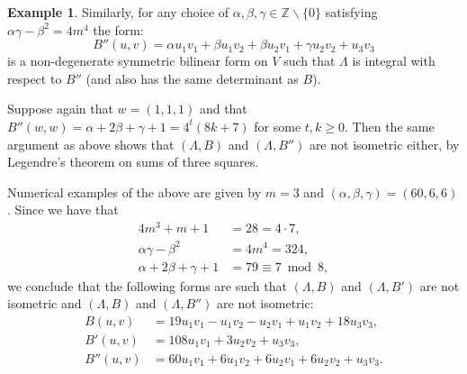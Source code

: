 \documentclass{amsart}
\theoremstyle{plain}
\theoremstyle{definition}
\newtheorem{eg}[theorem]{Example}
\begin{document}
\begin{eg}
Similarly, for any choice of $\alpha,\beta,\gamma\in\mathbb{Z}\backslash\{0\}$ satisfying $\alpha\gamma - \beta^2 = 4m^4$ the form: \[B''(u,v) = \alpha u_1v_1 + \beta u_1v_2 + \beta u_2v_1 + \gamma u_2v_2 + u_3v_3\] is a non-degenerate symmetric bilinear form on $V$ such that $\Lambda$ is integral with respect to $B''$ (and also has the same determinant as $B$).

Suppose again that $w=(1,1,1)$ and that $B''(w,w) = \alpha + 2\beta + \gamma + 1 = 4^t(8k+7)$ for some $t,k\geq 0$. Then the same argument as above shows that $(\Lambda,B)$ and $(\Lambda, B'')$ are not isometric either, by Legendre's theorem on sums of three squares.

Numerical examples of the above are given by $m = 3$ and $(\alpha,\beta,\gamma) = (60,6,6)$. Since we have that \begin{align*}4m^3+m+1 &= 28 = 4\cdot 7,\\ \alpha\gamma-\beta^2 &= 4m^4 = 324,\\ \alpha+2\beta+\gamma+1 &= 79 \equiv 7 \bmod 8,\end{align*} we conclude that the following forms are such that $(\Lambda,B)$ and $(\Lambda,B')$ are not isometric and $(\Lambda,B)$ and $(\Lambda,B'')$ are not isometric: \begin{align*}B(u,v) &= 19u_1v_1 - u_1v_2 - u_2v_1 + u_1v_2 + 18u_3v_3,\\ B'(u,v) &= 108u_1v_1 + 3u_2v_2 + u_3v_3,\\ B''(u,v) &= 60u_1v_1 + 6u_1v_2 + 6u_2v_1 + 6u_2v_2 + u_3v_3.\end{align*}
\end{eg}
\end{document}
